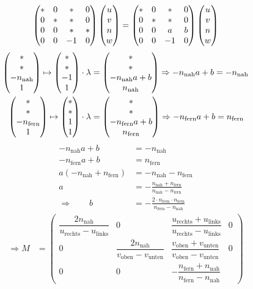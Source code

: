 \begin{itemize}
\[\begin{pmatrix}
	                               * & 0 & * & 0\\
				       0 & * & * & 0\\
				       0 & 0 & * & *\\
				       0 & 0 & -1& 0
	                              \end{pmatrix}
		\begin{pmatrix}u\\v\\n\\w\end{pmatrix} = \begin{pmatrix}
	                               * & 0 & * & 0\\
				       0 & * & * & 0\\
				       0 & 0 & a & b\\
				       0 & 0 & -1& 0
	                              \end{pmatrix}\begin{pmatrix}u\\v\\n\\w\end{pmatrix}\]
	\begin{align*}
	\begin{pmatrix}*\\ *\\-n_{\mathrm{nah}}\\1\end{pmatrix} \mapsto \begin{pmatrix}*\\ *\\-1\\1\end{pmatrix} \cdot \lambda
		&= \begin{pmatrix}*\\ *\\-n_{\mathrm{nah}} a+ b\\n_{\mathrm{nah}}\end{pmatrix}
			\Rightarrow -n_{\mathrm{nah}} a + b = -n_{\mathrm{nah}}\\
	\begin{pmatrix}*\\ *\\-n_{\mathrm{fern}}\\1\end{pmatrix} \mapsto \begin{pmatrix}*\\ *\\1\\1\end{pmatrix} \cdot \lambda
		&= \begin{pmatrix}*\\ *\\-n_{\mathrm{fern}} a+ b\\n_{\mathrm{fern}}\end{pmatrix}
			\Rightarrow -n_{\mathrm{fern}} a + b = n_{\mathrm{fern}}
	\end{align*}
	\begin{align*}
	 -n_{\mathrm{nah}} a + b &= -n_{\mathrm{nah}} \\
	 -n_{\mathrm{fern}} a + b &= n_{\mathrm{fern}}\\
	 \hline
	 a(-n_{\mathrm{nah}}+n_{\mathrm{fern}}) &= -n_{\mathrm{nah}}-n_{\mathrm{fern}}\\
	 a &= -\frac{n_{\mathrm{nah}}+n_{\mathrm{fern}}}{n_{\mathrm{nah}}-n_{\mathrm{fern}}}\\
	 \Rightarrow \qquad b &= -\frac{2 \cdot n_{\mathrm{fern}}\cdot n_{\mathrm{fern}}}
		{n_{\mathrm{fern}}-n_{\mathrm{nah}}}
	\end{align*}
	\begin{align*}
	\Rightarrow M &= \begin{pmatrix}
	       \dfrac{2 n_{\mathrm{nah}}}{u_{\mathrm{rechts}} - u_{\mathrm{links}}} & 0 &
	       \dfrac{u_{\mathrm{rechts}}+ u_{\mathrm{links}}}{u_{\mathrm{rechts}}-u_{\mathrm{links}}} & 0\\
	       0 & \dfrac{2 n_{\mathrm{nah}}}{v_{\mathrm{oben}} - v_{\mathrm{unten}}} &
	       \dfrac{v_{\mathrm{oben}}+v_{\mathrm{unten}}}{v_{\mathrm{oben}}-v_{\mathrm{unten}}} & 0\\
	       0 & 0 & - \dfrac{n_{\mathrm{fern}}+n_{\mathrm{nah}}}{n_{\mathrm{fern}}-n_{\mathrm{nah}}} &

\end{pmatrix}
\end{align*}
\end{itemize}
